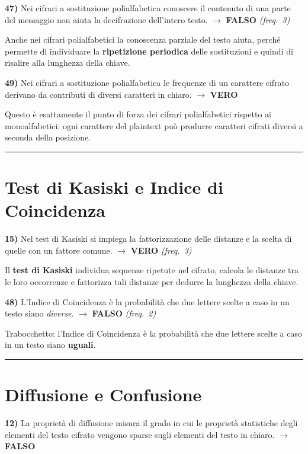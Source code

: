 \documentclass[12pt, a4paper]{report}
\newcommand{\vero}{\textcolor{verdeanswer}{\textbf{VERO}}}
\newcommand{\falso}{\textcolor{rossoanswer}{\textbf{FALSO}}}
\newcommand{\freq}[1]{\textcolor{freqcolor}{\textit{(freq.\ #1)}}}
\begin{document}
\noindent\textbf{47)} Nei cifrari a sostituzione polialfabetica conoscere il contenuto di una parte del messaggio non aiuta la decifrazione dell'intero testo. $\to$ \falso{} \freq{3}

\medskip
\noindent Anche nei cifrari polialfabetici la conoscenza parziale del testo aiuta, perché permette di individuare la \textbf{ripetizione periodica} delle sostituzioni e quindi di risalire alla lunghezza della chiave.

\medskip
\noindent\textbf{49)} Nei cifrari a sostituzione polialfabetica le frequenze di un carattere cifrato derivano da contributi di diversi caratteri in chiaro. $\to$ \vero{}

\medskip
\noindent Questo è esattamente il punto di forza dei cifrari polialfabetici rispetto ai monoalfabetici: ogni carattere del plaintext può produrre caratteri cifrati diversi a seconda della posizione.

\noindent\rule{\textwidth}{0.4pt}

\section{Test di Kasiski e Indice di Coincidenza}

\noindent\textbf{15)} Nel test di Kasiski si impiega la fattorizzazione delle distanze e la scelta di quelle con un fattore comune. $\to$ \vero{} \freq{3}

\medskip
\noindent Il \textbf{test di Kasiski} individua sequenze ripetute nel cifrato, calcola le distanze tra le loro occorrenze e fattorizza tali distanze per dedurre la lunghezza della chiave.

\medskip
\noindent\textbf{48)} L'Indice di Coincidenza è la probabilità che due lettere scelte a caso in un testo siano \textit{diverse}. $\to$ \falso{} \freq{2}

\medskip
\noindent Trabocchetto: l'Indice di Coincidenza è la probabilità che due lettere scelte a caso in un testo siano \textbf{uguali}.

\noindent\rule{\textwidth}{0.4pt}

\section{Diffusione e Confusione}

\noindent\textbf{12)} La proprietà di diffusione misura il grado in cui le proprietà statistiche degli elementi del testo cifrato vengono sparse sugli elementi del testo in chiaro. $\to$ \falso{}
\end{document}
